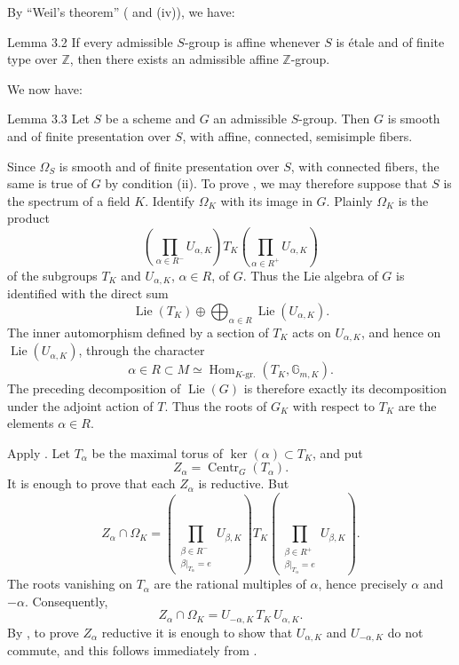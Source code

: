 By ``Weil's theorem'' ( and (iv)), we have:

\begin{sgastatement}{Lemma 3.2}
If every admissible \(S\)-group is affine whenever \(S\) is étale and
of finite type over \(\mathbb Z\), then there exists an admissible
affine \(\mathbb Z\)-group.
\end{sgastatement}

We now have:

\begin{sgastatement}{Lemma 3.3}
Let \(S\) be a scheme and \(G\) an admissible \(S\)-group. Then \(G\)
is smooth and of finite presentation over \(S\), with affine,
connected, semisimple fibers.
\end{sgastatement}

Since \(\Omega_S\) is smooth and of finite presentation over \(S\),
with connected fibers, the same is true of \(G\) by condition (ii).
To prove , we may therefore suppose that \(S\) is the spectrum of a
field \(K\). Identify \(\Omega_K\) with its image in \(G\). Plainly
\(\Omega_K\) is the product
\[
 \left(\prod_{\alpha\in R^-}U_{\alpha,K}\right)
 T_K
 \left(\prod_{\alpha\in R^+}U_{\alpha,K}\right)
\]
of the subgroups \(T_K\) and \(U_{\alpha,K}\), \(\alpha\in R\), of
\(G\). Thus the Lie algebra of \(G\) is identified with the direct sum
\[
 \operatorname{Lie}(T_K)
 \oplus
 \bigoplus_{\alpha\in R}\operatorname{Lie}(U_{\alpha,K}).
\]
The inner automorphism defined by a section of \(T_K\) acts on
\(U_{\alpha,K}\), and hence on \(\operatorname{Lie}(U_{\alpha,K})\),
through the character
\[
 \alpha\in R\subset M
 \simeq\operatorname{Hom}_{K\text{-gr.}}(T_K,\mathbb G_{m,K}).
\]
The preceding decomposition of \(\operatorname{Lie}(G)\) is therefore
exactly its decomposition under the adjoint action of \(T\). Thus the
roots of \(G_K\) with respect to \(T_K\) are the elements
\(\alpha\in R\).

Apply . Let \(T_\alpha\) be the maximal torus of
\(\ker(\alpha)\subset T_K\), and put
\[
 Z_\alpha=\operatorname{Centr}_G(T_\alpha).
\]
It is enough to prove that each \(Z_\alpha\) is reductive. But
\[
 Z_\alpha\cap\Omega_K
 =
 \left(
 \prod_{\substack{\beta\in R^-\\\beta|_{T_\alpha}=e}}
 U_{\beta,K}
 \right)
 T_K
 \left(
 \prod_{\substack{\beta\in R^+\\\beta|_{T_\alpha}=e}}
 U_{\beta,K}
 \right).
\]
The roots vanishing on \(T_\alpha\) are the rational multiples of
\(\alpha\), hence precisely \(\alpha\) and \(-\alpha\). Consequently,
\[
 Z_\alpha\cap\Omega_K
 =U_{-\alpha,K}\,T_K\,U_{\alpha,K}.
\]
By , to prove \(Z_\alpha\) reductive it is enough to show
that \(U_{\alpha,K}\) and \(U_{-\alpha,K}\) do not commute, and this
follows immediately from .

